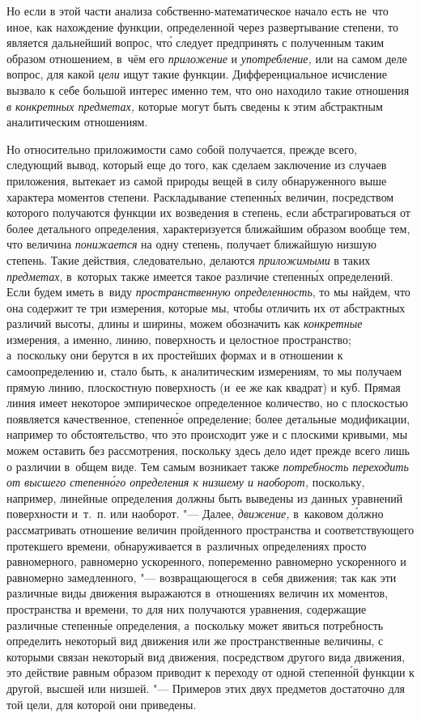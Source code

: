Но если в этой части анализа собственно-математическое начало есть не~что иное,
как нахождение функции, определенной через развертывание степени, то является
дальнейший вопрос, чт\'{о} следует предпринять с полученным таким образом
отношением, в~чём его {\em приложение} и {\em употребление,} или на самом деле
вопрос, для какой {\em цели} ищут такие функции. Дифференциальное исчисление
вызвало к себе большой интерес именно тем, что оно находило такие отношения
{\em в конкретных предметах,} которые могут быть сведены к этим абстрактным
аналитическим отношениям.

Но относительно приложимости само собой получается, прежде всего, следующий
вывод, который еще до того, как сделаем заключение из случаев приложения,
вытекает из самой природы вещей в силу обнаруженного выше характера моментов
степени. Раскладывание степенн\'{ы}х величин, посредством которого получаются
функции их возведения в степень, если абстрагироваться от более детального
определения, характеризуется ближайшим образом вообще тем, что величина
{\em понижается} на одну степень, получает ближайшую низшую степень. Такие
действия, следовательно, делаются {\em приложимыми} в таких {\em предметах},
в~которых также имеется такое различие степенн\'{ы}х определений. Если будем
иметь в~виду {\em пространственную определенность}, то мы найдем, что она
содержит те три измерения, которые мы, чтобы отличить их от абстрактных
различий высоты, длины и ширины, можем обозначить как {\em конкретные}
измерения, а именно, линию, поверхность и целостное пространство; а~поскольку
они берутся в их простейших формах и в отношении к самоопределению и, стало
быть, к аналитическим измерениям, то мы получаем прямую линию, плоскостную
поверхность (и~ее же как квадрат) и куб. Прямая линия имеет некоторое
эмпирическое определенное количество, но с плоскостью появляется качественное,
степенн\'{о}е определение; более детальные модификации, например то
обстоятельство, что это происходит уже и с плоскими кривыми, мы можем оставить
без рассмотрения, поскольку здесь дело идет прежде всего лишь о различии
в~общем виде. Тем самым возникает также {\em потребность переходить от высшего
степенн\'{о}го определения к низшему и наоборот,} поскольку, например, линейные
определения должны быть выведены из данных уравнений поверхности и~т.~п. или
наоборот. "--- Далее, {\em движение,} в~каковом д\'{о}лжно рассматривать отношение
величин пройденного пространства и соответствующего протекшего времени,
обнаруживается в~различных определениях просто равномерного, равномерно
ускоренного, попеременно равномерно ускоренного и равномерно замедленного, "---
возвращающегося в~себя движения; так как эти различные виды движения выражаются
в~отношениях величин их моментов, пространства и времени, то для них получаются
уравнения, содержащие различные степенн\'{ы}е определения, а~поскольку может
явиться потребность определить некоторый вид движения или же пространственные
величины, с которыми связан некоторый вид движения, посредством другого вида
движения, это действие равным образом приводит к переходу от одной
степенн\'{о}й функции к другой, высшей или низшей. "--- Примеров этих двух
предметов достаточно для той цели, для которой они приведены.

